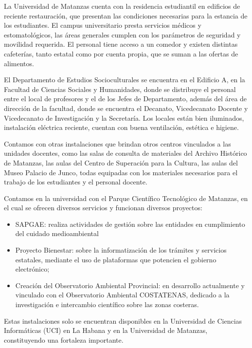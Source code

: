 La Universidad de Matanzas cuenta con la residencia estudiantil en edificios de reciente restauración, que presentan las condiciones necesarias para la estancia de los estudiantes. El campus universitario presta servicios médicos y estomatológicos, las áreas generales cumplen con los parámetros de seguridad y movilidad requerida. El personal tiene acceso a un comedor y existen distintas cafeterías, tanto estatal como por cuenta propia, que se suman a las ofertas de alimentos.

El Departamento de Estudios Socioculturales se encuentra en el Edificio A, en la Facultad de Ciencias Sociales y Humanidades, donde se distribuye el personal entre el local de profesores y el de los Jefes de Departamento, además del área de dirección de la facultad, donde se encuentra el Decanato, Vicedecanato Docente y Vicedecanato de Investigación y la Secretaría. Los locales están bien iluminados, instalación eléctrica reciente, cuentan con buena ventilación, estética e higiene.

Contamos con otras instalaciones que brindan otros centros vinculados a las unidades docentes, como las salas de consulta de materiales del Archivo Histórico de Matanzas, las aulas del Centro de Superación para la Cultura, las aulas del Museo Palacio de Junco, todas equipadas con los materiales necesarios para el trabajo de los estudiantes y el personal docente.

Contamos en la universidad con el Parque Científico Tecnológico de Matanzas, en el cual se ofrecen diversos servicios y funcionan diversos proyectos: 

\begin{itemize}
	\item SAPGAE: realiza actividades de gestión sobre las entidades en cumplimiento del cuidado medioambiental 
	\item Proyecto Bienestar: sobre la informatización de los trámites y servicios estatales, mediante el uso de plataformas que potencien el gobierno electrónico;
	\item Creación del Observatorio Ambiental Provincial: en desarrollo actualmente y vinculado con el Observatorio Ambiental COSTATENAS, dedicado a la investigación e intercambio científico sobre las zonas costeras.
\end{itemize}

Estas instalaciones solo se encuentran disponibles en la Universidad de Ciencias Informáticas (UCI) en La Habana y en la Universidad de Matanzas, constituyendo una fortaleza importante.\\

